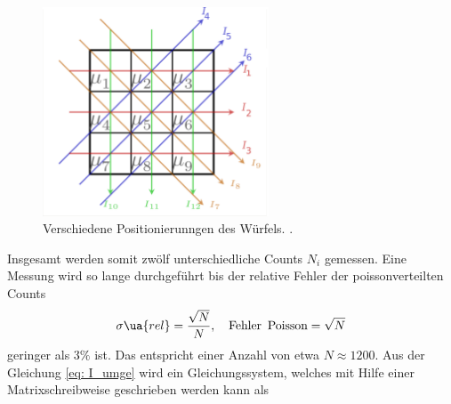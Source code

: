 \begin{figure}[h]
  \centering
  \includegraphics[width=0.6\textwidth]{pics/positionierung.pdf}
  \caption{Verschiedene Positionierunngen des Würfels. \cite{luckyjosh}.}
  \label{fig: positionierung}
\end{figure}

Insgesamt werden somit zwölf unterschiedliche Counts $N_i$ gemessen.
Eine Messung wird so lange durchgeführt bis der relative Fehler der poissonverteilten Counts
\begin{equation*}
  \sigma\ua{rel}=\frac{\sqrt{N}}{N}, \quad \text{Fehler\, Poisson}= \sqrt{N}
\end{equation*}
geringer als $3\%$ ist. Das entspricht einer Anzahl von etwa $N\approx 1200$.
Aus der Gleichung \eqref{eq: I_umge} wird ein Gleichungssystem, welches mit Hilfe einer
Matrixschreibweise geschrieben werden kann als

